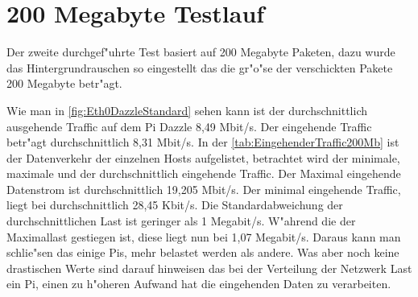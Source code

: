 \section{200 Megabyte Testlauf}
\label{sec:200MBTest}
Der zweite durchgef"uhrte Test basiert auf 200 Megabyte Paketen, dazu wurde das Hintergrundrauschen %
so eingestellt das die gr"o"se der verschickten Pakete 200 Megabyte betr"agt. 

Wie man in \cref{fig:Eth0DazzleStandard} sehen kann ist der durchschnittlich ausgehende Traffic auf dem Pi Dazzle 8,49 Mbit/s. %
Der eingehende Traffic betr"agt durchschnittlich 8,31 Mbit/s. In der \cref{tab:EingehenderTraffic200Mb} %
ist der Datenverkehr der einzelnen Hosts aufgelistet, betrachtet wird der minimale, maximale und der durchschnittlich eingehende Traffic. %
Der Maximal eingehende Datenstrom ist durchschnittlich 19,205 Mbit/s. Der minimal eingehende Traffic, liegt bei %
durchschnittlich 28,45 Kbit/s. Die Standardabweichung der durchschnittlichen Last ist geringer als 1 Megabit/s. %
W"ahrend die der Maximallast gestiegen ist, diese liegt nun bei 1,07 Megabit/s. Daraus kann man schlie"sen das %
einige Pis, mehr belastet werden als andere. Was aber noch keine drastischen Werte sind darauf hinweisen %
das bei der Verteilung der Netzwerk Last ein Pi, einen zu h"oheren Aufwand hat die eingehenden Daten zu %
verarbeiten. 


